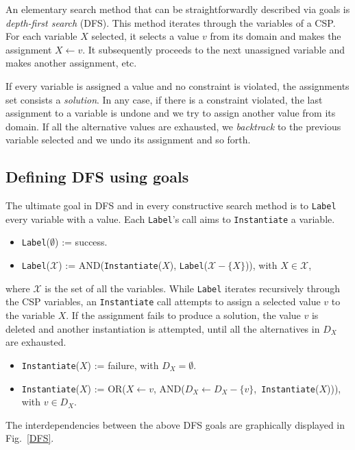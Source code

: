 \documentclass{ws-ijait}
\begin{document}
An elementary search method that can be straightforwardly
described via goals is \emph{depth-first search} (DFS). This
method iterates through the variables of a CSP\@. For each
variable $X$ selected, it selects a value $v$ from its
domain and makes the assignment $X \gets v$. It subsequently
proceeds to the next unassigned variable and makes another
assignment, etc.

If every variable is assigned a value and no constraint is
violated, the assignments set consists a \emph{solution}. In
any case, if there is a constraint violated, the last
assignment to a variable is undone and we try to assign
another value from its domain. If all the alternative values
are exhausted, we \emph{backtrack} to the previous variable
selected and we undo its assignment and so forth.

\subsection{Defining DFS using goals\label{DFS-goals}}

The ultimate goal in DFS and in every constructive search
method is to \texttt{Label} every variable with a value.
Each \texttt{Label}'s call aims to \texttt{Instantiate} a
variable.
\begin{itemize}
  \item \texttt{Label}($\emptyset$) := \textsf{success}.
  \item \texttt{Label}($\mathscr{X}$) :=
          \textsf{AND}(\texttt{Instantiate}($X$),
            \texttt{Label}($\mathscr{X} \! - \! \{X\}$)),
        with $X \in \mathscr{X}$,
\end{itemize}
where $\mathscr{X}$ is the set of all the variables. While
\texttt{Label} iterates recursively through the CSP
variables, an \texttt{Instantiate} call attempts to assign a
selected value $v$ to the variable $X$. If the assignment
fails to produce a solution, the value $v$ is deleted and
another instantiation is attempted, until all the
alternatives in $D_X$ are exhausted.
\begin{itemize}
  \item \texttt{Instantiate}($X$) := \textsf{failure},
          with $D_X = \emptyset$.
  \item \texttt{Instantiate}($X$) :=
          \textsf{OR}($X \! \gets \! v$,
            \textsf{AND}($D_X \!\! \gets \!\!
            D_X \!\! - \!\! \{v\}$,\,
            \texttt{Instantiate}($X$))), with $v \in D_X$.
\end{itemize}
The interdependencies between the above DFS goals are
graphically displayed in Fig.~\ref{DFS}.
\end{document}
